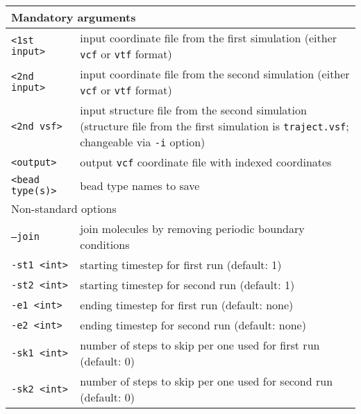 \vspace{1em}
\noindent
\begin{longtable}{p{}p{}}
  \toprule
  \multicolumn{2}{l}{Mandatory arguments} \\
  \midrule
  \texttt{<1st input>} & input coordinate file from the first simulation (either \texttt{vcf} or
    \texttt{vtf} format) \\
  \texttt{<2nd input>} & input coordinate file from the second simulation (either \texttt{vcf} or
    \texttt{vtf} format) \\
  \texttt{<2nd vsf>} & input structure file from the second simulation
    (structure file from the first simulation is \texttt{traject.vsf};
    changeable via \texttt{-i} option) \\
  \texttt{<output>} & output \texttt{vcf} coordinate file with indexed
    coordinates \\
  \texttt{<bead type(s)>} & bead type names to save \\
  \toprule
  \multicolumn{2}{l}{Non-standard options} \\
  \midrule
  \texttt{--join} & join molecules by removing periodic boundary conditions \\
  \texttt{-st1 <int>} & starting timestep for first run (default: 1) \\
  \texttt{-st2 <int>} & starting timestep for second run (default: 1) \\
  \texttt{-e1 <int>} & ending timestep for first run (default: none) \\
  \texttt{-e2 <int>} & ending timestep for second run (default: none) \\
  \texttt{-sk1 <int>} & number of steps to skip per one used for first run (default: 0) \\
  \texttt{-sk2 <int>} & number of steps to skip per one used for second run (default: 0) \\
  \bottomrule
\end{longtable}
